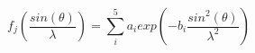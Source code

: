 


$$ 
  f_j\left ( \frac{sin(\theta)}{\lambda} \right )=\sum_{i}^{5}
a_i exp\left ( -b_i \frac{sin^{2}(\theta)}{\lambda^{2}} \right )
$$


